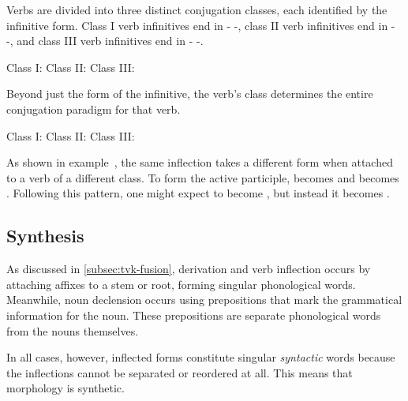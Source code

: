 Verbs are divided into three distinct conjugation classes, each identified by the infinitive form. Class I verb infinitives end in - -, class II verb infinitives end in - -, and class III verb infinitives end in - -.

	Class I:     
	\a<cl2>Class II:     
	\a<cl3>Class III:     
\xe

Beyond just the form of the infinitive, the verb's class determines the entire conjugation paradigm for that verb.

	Class I:     
	\a<cl2>Class II:     
	\a<cl3>Class III:     
\xe

As shown in example~, the same inflection takes a different form when attached to a verb of a different class. To form the active participle,   becomes   and   becomes  . Following this pattern, one might expect   to become \ungr{} \ungr{}, but instead it becomes  .


\subsection{Synthesis}
\label{subsec:tvk-synthesis}

As discussed in \autoref{subsec:tvk-fusion}, derivation and verb inflection occurs by attaching affixes to a stem or root, forming singular phonological words. Meanwhile, noun declension occurs using prepositions that mark the grammatical information for the noun. These prepositions are separate phonological words from the nouns themselves.

In all cases, however, inflected forms constitute singular \emph{syntactic} words because the inflections cannot be separated or reordered at all. This means that \langtvk{} morphology is synthetic\autocite{wals-22}.

